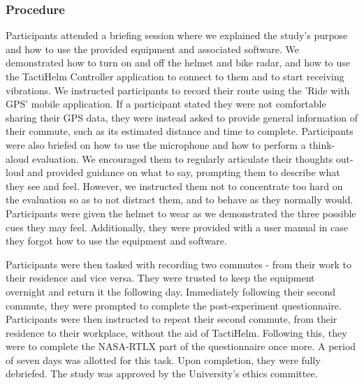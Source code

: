 \documentclass{mpaper}
\begin{document}
\subsubsection{Procedure}
Participants attended a briefing session where we explained the study's purpose and how to use the provided equipment and associated software. We demonstrated how to turn on and off the helmet and bike radar, and how to use the TactiHelm Controller application to connect to them and to start receiving vibrations. We instructed participants to record their route using the 'Ride with GPS' mobile application. If a participant stated they were not comfortable sharing their GPS data, they were instead asked to provide general information of their commute, such as its estimated distance and time to complete. Participants were also briefed on how to use the microphone and how to perform a think-aloud evaluation. We encouraged them to regularly articulate their thoughts out-loud and provided guidance on what to say, prompting them to describe what they see and feel. However, we instructed them not to concentrate too hard on the evaluation so as to not distract them, and to behave as they normally would. Participants were given the helmet to wear as we demonstrated the three possible cues they may feel. Additionally, they were provided with a user manual in case they forgot how to use the equipment and software. 

Participants were then tasked with recording two commutes - from their work to their residence and vice versa. They were trusted to keep the equipment overnight and return it the following day. Immediately following their second commute, they were prompted to complete the post-experiment questionnaire. Participants were then instructed to repeat their second commute, from their residence to their workplace, without the aid of TactiHelm. Following this, they were to complete the NASA-RTLX part of the questionnaire once more. A period of seven days was allotted for this task. Upon completion, they were fully debriefed. The study was approved by the University’s ethics committee.
\end{document}
